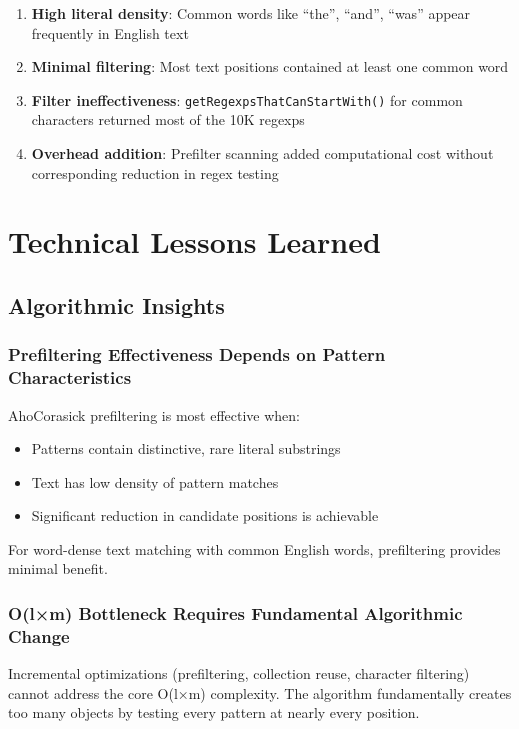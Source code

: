 \documentclass[11pt,a4paper]{article}
\begin{document}
\begin{enumerate}
\item \textbf{High literal density}: Common words like ``the'', ``and'', ``was'' appear frequently in English text
\item \textbf{Minimal filtering}: Most text positions contained at least one common word
\item \textbf{Filter ineffectiveness}: \texttt{getRegexpsThatCanStartWith()} for common characters returned most of the 10K regexps
\item \textbf{Overhead addition}: Prefilter scanning added computational cost without corresponding reduction in regex testing
\end{enumerate}

\section{Technical Lessons Learned}

\subsection{Algorithmic Insights}

\subsubsection{Prefiltering Effectiveness Depends on Pattern Characteristics}
AhoCorasick prefiltering is most effective when:
\begin{itemize}
\item Patterns contain distinctive, rare literal substrings
\item Text has low density of pattern matches
\item Significant reduction in candidate positions is achievable
\end{itemize}

For word-dense text matching with common English words, prefiltering provides minimal benefit.

\subsubsection{O(l×m) Bottleneck Requires Fundamental Algorithmic Change}
Incremental optimizations (prefiltering, collection reuse, character filtering) cannot address the core O(l×m) complexity. The algorithm fundamentally creates too many objects by testing every pattern at nearly every position.
\end{document}
